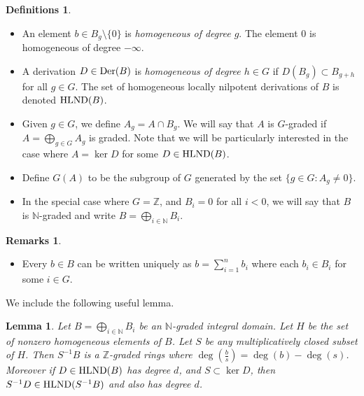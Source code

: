 \documentclass[12pt]{amsart}
\theoremstyle{plain}
\newtheorem{lemma}[subsection]{Lemma}
\theoremstyle{definition}
\newtheorem{definitions}[subsection]{Definitions}
\newtheorem{remarks}[subsection]{Remarks}
\newcommand{\Der}{		\operatorname{{\rm Der}}}
\newcommand{\Integ}{\ensuremath{\mathbb{Z}}}
\newcommand{\Nat}{\ensuremath{\mathbb{N}}}
\newcommand{\hlnd}{\operatorname{{\rm HLND}}}
\begin{document}
\begin{definitions} 
	
\begin{itemize}
	
	\item An element $b \in B_g \setminus\{0\}$ is \textit{homogeneous of degree $g$}. The element 0 is homogeneous of degree $-\infty$. 
	
	\item A derivation $D \in \Der(B)$ is  \textit{homogeneous of degree $h \in G$} if $D(B_g) \subset B_{g+h}$ for all $g \in G$. The set of homogeneous locally nilpotent derivations of $B$ is denoted $\hlnd(B)$. 
	
	\item Given $g \in G$, we define $A_g = A \cap B_g$. We will say that $A$ is $G$-graded if $A = \bigoplus\limits_{g \in G} A_g$ is graded. Note that we will be particularly interested in the case where $A = \ker D$ for some $D \in \hlnd(B)$. 
	
	\item Define $G(A)$ to be the subgroup of $G$ generated by the set $\{g \in G : A_g \neq 0\}$. 
	
	\item In the special case where $G = \Integ$, and $B_i = 0$ for all $i < 0$, we will say that $B$ is $\Nat$-graded and write $B = \bigoplus\limits_{i \in \Nat} B_i$. 
	
	
\end{itemize}



\end{definitions}  
\begin{remarks}
	\begin{itemize}
		\item Every $b \in B$ can be written uniquely as $b = \sum \limits_{i=1}^n b_i$ where each $b_i \in B_i$ for some $i \in G$. 		
		 
	\end{itemize} 	
\end{remarks}

We include the following useful lemma. 

\begin{lemma}\label{homoLoc}
	Let $B = \bigoplus\limits_{i \in \Nat} B_i$ be an $\Nat$-graded integral domain. Let $H$ be the set of nonzero homogeneous elements of $B$. Let $S$ be any multiplicatively closed subset of $H$. Then $S^{-1}B$ is a $\Integ$-graded rings where $\deg(\frac{b}{s}) = \deg(b) - \deg(s)$. Moreover if $D \in \hlnd(B)$ has degree $d$,  and $S \subset \ker D$, then $S^{-1}D \in \hlnd(S^{-1}B)$ and also has degree $d$.  
\end{lemma}
\end{document}
